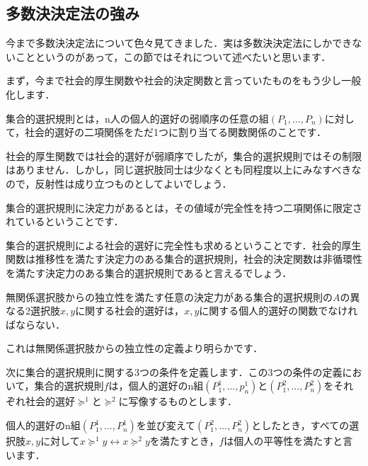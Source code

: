 \subsection{多数決決定法の強み}

今まで多数決決定法について色々見てきました．実は多数決決定法にしかできないことというのがあって，この節ではそれについて述べたいと思います．

まず，今まで社会的厚生関数や社会的決定関数と言っていたものをもう少し一般化します．

\begin{dfn}[集合的選択規則]
    集合的選択規則とは，n人の個人的選好の弱順序の任意の組$(P_1,\dots,P_n)$に対して，社会的選好の二項関係をただ1つに割り当てる関数関係のことです．
\end{dfn}

社会的厚生関数では社会的選好が弱順序でしたが，集合的選択規則ではその制限はありません．しかし，同じ選択肢同士は少なくとも同程度以上にみなすべきなので，反射性は成り立つものとしてよいでしょう．

\begin{dfn}[決定力]
    集合的選択規則に決定力があるとは，その値域が完全性を持つ二項関係に限定されているということです．
\end{dfn}

集合的選択規則による社会的選好に完全性も求めるということです．社会的厚生関数は推移性を満たす決定力のある集合的選択規則，社会的決定関数は非循環性を満たす決定力のある集合的選択規則であると言えるでしょう．

\begin{lem}
    無関係選択肢からの独立性を満たす任意の決定力がある集合的選択規則の$A$の異なる2選択肢$x,y$に関する社会的選好は，$x,y$に関する個人的選好の関数でなければならない．
\end{lem}

これは無関係選択肢からの独立性の定義より明らかです．

次に集合的選択規則に関する3つの条件を定義します．この3つの条件の定義において，集合的選択規則$f$は，個人的選好のn組$(P^1_1,\dots,p^1_n)$と$(P^2_1,\dots,P^2_n)$をそれぞれ社会的選好$\succeq^1$と$\succeq^2$に写像するものとします．

\begin{dfn}[個人の平等性]
    個人的選好のn組$(P^1_1,\dots,P^1_n)$を並び変えて$(P^2_1,\dots,P^2_n)$としたとき，すべての選択肢$x,y$に対して$x \succeq^1 y \leftrightarrow x \succeq^2 y$を満たすとき，$f$は個人の平等性を満たすと言います．
\end{dfn}

